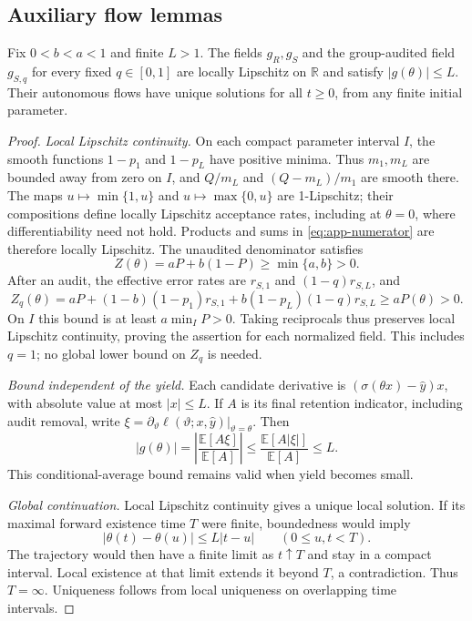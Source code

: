 \subsection{Auxiliary flow lemmas}
\begin{lemma}
\label{lem:flow-regularity}
Fix $0<b<a<1$ and finite $L>1$. The fields $g_R,g_S$ and the group-audited
field $g_{S,q}$ for every fixed $q\in[0,1]$ are locally Lipschitz on
$\mathbb R$ and satisfy $|g(\theta)|\leq L$. Their autonomous flows have
unique solutions for all $t\geq0$, from any finite initial parameter.
\end{lemma}
\begin{proof}
\textit{Local Lipschitz continuity.}
On each compact parameter interval $I$, the smooth functions $1-p_1$ and
$1-p_L$ have positive minima. Thus $m_1,m_L$ are bounded away from zero
on $I$, and $Q/m_L$ and $(Q-m_L)/m_1$ are smooth there. The maps
$u\mapsto\min\{1,u\}$ and $u\mapsto\max\{0,u\}$ are 1-Lipschitz;
their compositions define locally Lipschitz acceptance rates, including
at $\theta=0$, where differentiability need not hold. Products and sums in
\eqref{eq:app-numerator} are therefore locally Lipschitz. The unaudited
denominator satisfies
\[
 Z(\theta)=aP+b(1-P)\geq\min\{a,b\}>0.
\]
After an audit, the effective error rates are $r_{S,1}$ and
$(1-q)r_{S,L}$, and
\[
 Z_q(\theta)=aP+(1-b)(1-p_1)r_{S,1}
                   +b(1-p_L)(1-q)r_{S,L}\geq aP(\theta)>0.
\]
On $I$ this bound is at least $a\min_I P>0$. Taking reciprocals thus
preserves local Lipschitz continuity, proving the assertion for each
normalized field. This includes $q=1$; no global lower bound on $Z_q$
is needed.

\textit{Bound independent of the yield.}
Each candidate derivative is $(\sigma(\theta x)-\hat y)x$, with absolute
value at most $|x|\leq L$. If $A$ is its final retention indicator,
including audit removal, write
$\xi=\partial_\vartheta\ell(\vartheta;x,\hat y)|_{\vartheta=\theta}$. Then
\[
 |g(\theta)|
 =\left|\frac{\mathbb E[A\xi]}{\mathbb E[A]}\right|
 \leq\frac{\mathbb E[A|\xi|]}{\mathbb E[A]}\leq L.
\]
This conditional-average bound remains valid when yield becomes small.

\textit{Global continuation.}
Local Lipschitz continuity gives a unique local solution. If its maximal
forward existence time $T$ were finite, boundedness would imply
\[
 |\theta(t)-\theta(u)|\leq L|t-u|\qquad(0\leq u,t<T).
\]
The trajectory would then have a finite limit as $t\uparrow T$ and stay
in a compact interval. Local existence at that limit extends it beyond
$T$, a contradiction. Thus $T=\infty$. Uniqueness follows from local
uniqueness on overlapping time intervals.
\end{proof}

